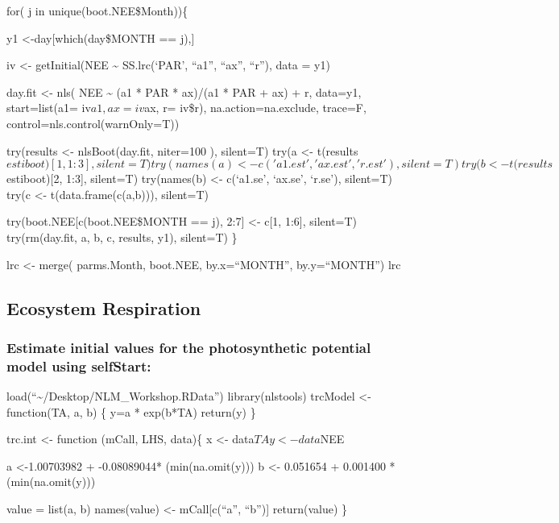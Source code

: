 \documentclass[
]{article}
\begin{document}
for( j in unique(boot.NEE\$Month))\{

y1 \textless-day{[}which(day\$MONTH == j),{]}

iv \textless- getInitial(NEE \textasciitilde{} SS.lrc(`PAR', ``a1'',
``ax'', ``r''), data = y1)

day.fit \textless- nls( NEE \textasciitilde{} (a1 * PAR * ax)/(a1 * PAR
+ ax) + r, data=y1, start=list(a1= iv\(a1 , ax= iv\)ax, r= iv\$r),
na.action=na.exclude, trace=F, control=nls.control(warnOnly=T))

try(results \textless- nlsBoot(day.fit, niter=100 ), silent=T) try(a
\textless-
t(results\(estiboot)[1, 1:3], silent=T) try(names(a) <- c('a1.est', 'ax.est', 'r.est'), silent=T) try( b <- t(results\)estiboot){[}2,
1:3{]}, silent=T) try(names(b) \textless- c(`a1.se', `ax.se', `r.se'),
silent=T) try(c \textless- t(data.frame(c(a,b))), silent=T)

try(boot.NEE{[}c(boot.NEE\$MONTH == j), 2:7{]} \textless- c{[}1, 1:6{]},
silent=T) try(rm(day.fit, a, b, c, results, y1), silent=T) \}

lrc \textless- merge( parms.Month, boot.NEE, by.x=``MONTH'',
by.y=``MONTH'') lrc

\hypertarget{ecosystem-respiration}{%
\subsection{Ecosystem Respiration}\label{ecosystem-respiration}}

\hypertarget{estimate-initial-values-for-the-photosynthetic-potential-model-using-selfstart-1}{%
\subsubsection{Estimate initial values for the photosynthetic potential
model using
selfStart:}\label{estimate-initial-values-for-the-photosynthetic-potential-model-using-selfstart-1}}

load(``\textasciitilde/Desktop/NLM\_Workshop.RData'') library(nlstools)
trcModel \textless- function(TA, a, b) \{ y=a * exp(b*TA) return(y) \}

trc.int \textless- function (mCall, LHS, data)\{ x \textless-
data\(TA  y <- data\)NEE

a \textless-1.00703982 + -0.08089044* (min(na.omit(y))) b \textless-
0.051654 + 0.001400 * (min(na.omit(y)))

value = list(a, b) names(value) \textless- mCall{[}c(``a'', ``b''){]}
return(value) \}
\end{document}
